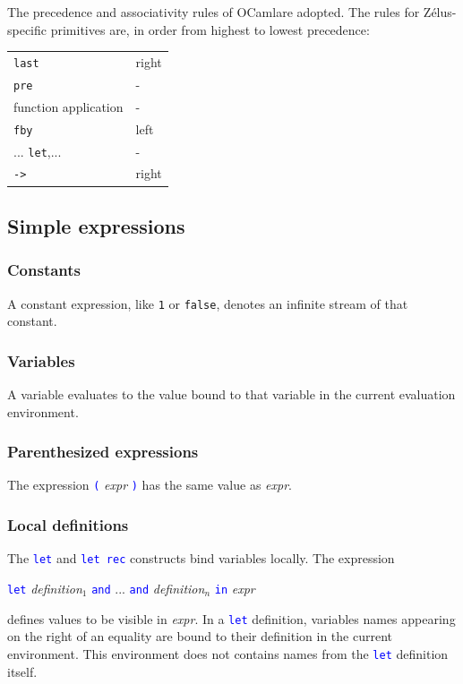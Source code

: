 \documentclass[11pt,titlepage,twoside]{report}
\makeatletter
\newcommand{\zls}[1]{{\@span{class="zelusinline"}#1}}
\newcommand{\zls}[1]{\texttt{#1}}
\renewcommand{\zls}[1]{\texttt{#1}}
\newcommand{\zelus}{{\sf Z\'elus}}
\newcommand{\ocaml}{{\sf OCaml}}
\newcommand{\Let}{\mbox{{\tt let}}}
\newcommand{\Rec}{\mbox{{\tt rec}}}
\newcommand{\In}{\mbox{{\tt in}}}
\newcommand{\AND}{\mbox{{\tt and}}}
\newcommand{\Pre}{\mbox{{\tt pre}}}
\newcommand{\Last}{\mbox{{\tt last}}}
\newcommand{\Fby}{\mbox{{\tt fby}}}
\newcommand{\Minusgreater}{\mbox{{\tt ->}}}
\newcommand{\term}[1]{\textcolor{Blue}{\tt #1}}
\newcommand{\nterm}[1]{\textcolor{BrickRed}{\it #1}}
\newcommand{\term}[1]{{\tt #1}}
\newcommand{\nterm}[1]{{\em #1}}
\makeatother
\begin{document}
The precedence and associativity rules of \ocaml are adopted.
The rules for \zelus-specific primitives are, in order from highest to 
lowest precedence:
\begin{center}
{
\begin{tabular}{|l|l|} \hline
\Last                           & right         \\
\Pre                            & -             \\
function application            & -             \\
\Fby                            & left          \\
...
\Let,...                        & -             \\ 
\Minusgreater                   & right         \\ \hline
\end{tabular}
}
\end{center}

\subsection{Simple expressions\label{simpleexpressions}} %
\subsubsection{Constants} %

A constant expression, like \zls{1} or \zls{false}, denotes an infinite 
stream of that constant.

\subsubsection{Variables} %

A variable evaluates to the value bound to that variable in the current 
evaluation environment.

\subsubsection{Parenthesized expressions} %

The expression \term{(} \nterm{expr} \term{)} has the same value as
\nterm{expr}.

\subsubsection{Local definitions} %

The \term{\Let} and \term{\Let\ \Rec} constructs bind variables
locally. The expression 
\begin{center}
  \term{\Let} \nterm{definition}$_1$ \term{\AND} ... 
  \term{\AND} \nterm{definition}$_n$ \term{\In} \nterm{expr}
\end{center}
defines values to be visible in \nterm{expr}. In a \term{\Let} definition,
variables names appearing on the right of an equality are bound to their definition
in the current environment. This environment does not contains names from
the \term{\Let} definition itself.
\end{document}
